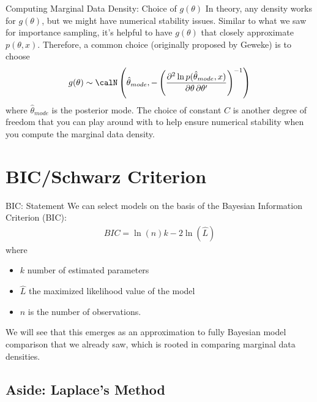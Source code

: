 \documentclass[aspectratio=169, handout]{beamer}
\begin{document}
{\footnotesize
\begin{frame}{Computing Marginal Data Density: Choice of $g(\theta)$}
In theory, any density works for $g(\theta)$, but we might have
numerical stability issues.
Similar to what we saw for importance sampling, it's helpful to have
$g(\theta)$ that closely approximate $p(\theta,x)$.
Therefore, a common choice (originally proposed by \alert{Geweke}) is to
choose
\begin{align*}
  g(\theta)
  \sim
  \calN\left(
  \hat{\theta}_{mode},
  -
  \left(
  \frac{\partial^2 \ln p(\hat{\theta}_{mode},x)}{\partial\theta\,\partial\theta'}
  \right)^{-1}
  \right)
\end{align*}
where $\hat{\theta}_{mode}$ is the posterior mode.
The choice of constant $C$ is another degree of freedom that you can
play around with to help ensure numerical stability when you compute the
marginal data density.
\end{frame}
}





\section{BIC/Schwarz Criterion}


{\footnotesize
\begin{frame}{BIC: Statement}
We can select models on the basis of the
\alert{Bayesian Information Criterion} (\alert{BIC}):
\begin{align*}
  BIC = \ln(n)k - 2\ln(\hat{L})
\end{align*}
where
\begin{itemize}
  \item $k$ number of estimated parameters
  \item $\hat{L}$ the maximized likelihood value of the model
  \item $n$ is the number of observations.
\end{itemize}
We will see that this emerges as an \alert{approximation} to
\alert{fully Bayesian model comparison} that we already saw, which is
rooted in comparing marginal data densities.
\end{frame}
}


\subsection{Aside: Laplace's Method}
\end{document}
